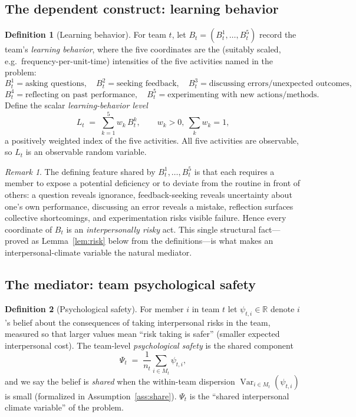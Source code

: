 \documentclass{amsart}
\theoremstyle{definition}
\newtheorem{definition}{Definition}
\theoremstyle{remark}
\newtheorem{remark}{Remark}
\begin{document}
\subsection{The dependent construct: learning behavior}
\begin{definition}[Learning behavior]\label{def:LB}
For team $t$, let $B_t=(B_t^{1},\dots,B_t^{5})$ record the team's
\emph{learning behavior}, where the five coordinates are the (suitably
scaled, e.g.\ frequency-per-unit-time) intensities of the five activities
named in the problem:
\[
B_t^{1}=\text{asking questions},\quad
B_t^{2}=\text{seeking feedback},\quad
B_t^{3}=\text{discussing errors/unexpected outcomes},
\]
\[
B_t^{4}=\text{reflecting on past performance},\quad
B_t^{5}=\text{experimenting with new actions/methods}.
\]
Define the scalar \emph{learning-behavior level}
\[
L_t \;=\; \sum_{k=1}^{5} w_k\, B_t^{k},\qquad w_k>0,\ \sum_k w_k=1,
\]
a positively weighted index of the five activities. All five activities
are observable, so $L_t$ is an observable random variable.
\end{definition}

\begin{remark}
The defining feature shared by $B_t^1,\dots,B_t^5$ is that each requires a
member to expose a potential deficiency or to deviate from the routine in
front of others: a question reveals ignorance, feedback-seeking reveals
uncertainty about one's own performance, discussing an error reveals a
mistake, reflection surfaces collective shortcomings, and experimentation
risks visible failure. Hence every coordinate of $B_t$ is an
\emph{interpersonally risky} act. This single structural fact---proved as
Lemma~\ref{lem:risk} below from the definitions---is what makes an
interpersonal-climate variable the natural mediator.
\end{remark}

\subsection{The mediator: team psychological safety}
\begin{definition}[Psychological safety]\label{def:PS}
For member $i$ in team $t$ let $\psi_{t,i}\in\mathbb{R}$ denote $i$'s
belief about the consequences of taking interpersonal risks in the team,
measured so that larger values mean ``risk taking is safer'' (smaller
expected interpersonal cost). The team-level \emph{psychological safety}
is the shared component
\[
\Psi_t \;=\; \frac{1}{n_t}\sum_{i\in M_t}\psi_{t,i},
\]
and we say the belief is \emph{shared} when the within-team dispersion
$\operatorname{Var}_{i\in M_t}(\psi_{t,i})$ is small (formalized in
Assumption~\ref{ass:share}). $\Psi_t$ is the ``shared interpersonal
climate variable'' of the problem.
\end{definition}
\end{document}
